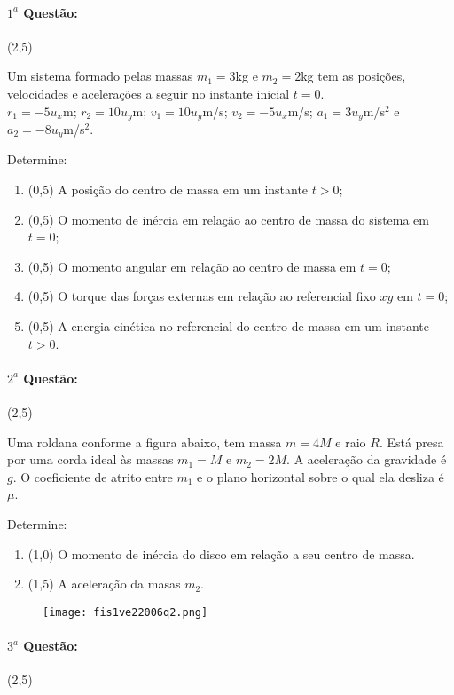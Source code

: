 \documentclass[12pt,a4paper]{article}
\begin{document}
\paragraph{$1^a$ Questão:} (2,5)

Um sistema formado pelas massas $m_1=3$kg e $m_2=2$kg tem as posições, velocidades e acelerações a seguir no instante inicial $t=0$.\\
$r_1=-5 u_x$m; $r_2=10 u_y$m; $v_1=10 u_y$m/s; $v_2=-5 u_x$m/s; $a_1=3 u_y$m/s$^2$ e $a_2=-8 u_y$m/s$^2$.

Determine:
\begin{enumerate}[label=\alph*)]
\item (0,5) A posição do centro de massa em um instante $t>0$;
\item (0,5) O momento de inércia em relação ao centro de massa do sistema em $t=0$;
\item (0,5) O momento angular em relação ao centro de massa em $t=0$;
\item (0,5) O torque das forças externas em relação ao referencial fixo $xy$ em $t=0$;
\item (0,5) A energia cinética no referencial do centro de massa em um instante $t>0$.
\end{enumerate}

\paragraph{$2^a$ Questão:} (2,5)

Uma roldana conforme a figura abaixo, tem massa $m=4M$ e raio $R$. Está presa por uma corda ideal às massas $m_1=M$ e $m_2=2M$.
A aceleração da gravidade é $g$. O coeficiente de atrito entre $m_1$ e o plano horizontal sobre o qual ela desliza é $\mu$.

Determine:

\begin{enumerate}[label=\alph*)]
\item (1,0) O momento de inércia do disco em relação a seu centro de massa.
\item (1,5) A aceleração da masas $m_2$.
\end{enumerate}

\begin{figure}[ht]
\centering
\texttt{[image: fis1ve22006q2.png]}
\end{figure}

\paragraph{$3^a$ Questão:} (2,5)
\end{document}
